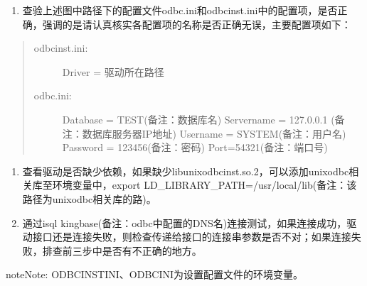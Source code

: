 \documentclass[a4,10pt,oneside,english]{sphinxmanual}
\begin{document}
\begin{figure}[H]
\centering

\noindent{}
\end{figure}
\begin{enumerate}
%
\setcounter{enumi}{1}
\item {} 
查验上述图中路径下的配置文件odbc.ini和odbcinst.ini中的配置项，是否正确，强调的是请认真核实各配置项的名称是否正确无误，主要配置项如下：

\end{enumerate}
\begin{quote}
\begin{description}
\item[{odbcinst.ini:}] \leavevmode
Driver = 驱动所在路径

\item[{odbc.ini:}] \leavevmode
Database = TEST(备注：数据库名)
Servername = 127.0.0.1 (备注：数据库服务器IP地址)
Username = SYSTEM(备注：用户名)
Password = 123456(备注：密码)
Port=54321(备注：端口号)

\end{description}
\end{quote}
\begin{enumerate}
%
\setcounter{enumi}{2}
\item {} 
查看驱动是否缺少依赖，如果缺少libunixodbcinst.so.2，可以添加unixodbc相关库至环境变量中，export LD\_LIBRARY\_PATH=/usr/local/lib(备注：该路径为unixodbc相关库的路)。

\item {} 
通过isql kingbase(备注：odbc中配置的DNS名)连接测试，如果连接成功，驱动接口还是连接失败，则检查传递给接口的连接串参数是否不对；如果连接失败，排查前三步中是否有不正确的地方。

\end{enumerate}

\begin{sphinxadmonition}{note}{Note:}
ODBCINSTINI、ODBCINI为设置配置文件的环境变量。
\end{sphinxadmonition}
\end{document}
